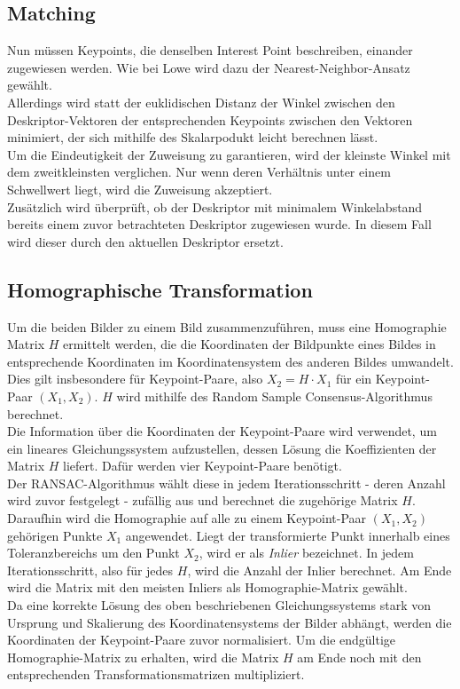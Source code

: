 \documentclass[deutsch]{scrartcl}
\begin{document}
\subsection{Matching} 
Nun müssen Keypoints, die denselben Interest Point beschreiben, einander zugewiesen werden. Wie bei Lowe\cite{lowe04} wird dazu der Nearest-Neighbor-Ansatz gewählt.\\
Allerdings wird statt der euklidischen Distanz der Winkel zwischen den Deskriptor-Vektoren der entsprechenden Keypoints zwischen den Vektoren minimiert, der sich mithilfe des Skalarpodukt leicht berechnen lässt. \\
Um die Eindeutigkeit der Zuweisung zu garantieren, wird der kleinste Winkel mit dem zweitkleinsten verglichen\cite{lowe04}. Nur wenn deren Verhältnis unter einem Schwellwert liegt, wird die Zuweisung akzeptiert.\\
Zusätzlich wird überprüft, ob der Deskriptor mit minimalem Winkelabstand bereits einem zuvor betrachteten Deskriptor zugewiesen wurde. In diesem Fall wird dieser durch den aktuellen Deskriptor ersetzt.\\

\subsection{Homographische Transformation}
Um die beiden Bilder zu einem Bild zusammenzuführen, muss eine Homographie Matrix $H$ ermittelt werden, die die Koordinaten der Bildpunkte eines Bildes in entsprechende Koordinaten im Koordinatensystem des anderen Bildes umwandelt. Dies gilt insbesondere für Keypoint-Paare, also $X_2=H\cdot X_1$ für ein Keypoint-Paar $(X_1,X_2)$. $H$ wird mithilfe des Random Sample Consensus-Algorithmus\cite{dubrovsky09} berechnet.\\
Die Information über die Koordinaten der Keypoint-Paare wird verwendet, um ein lineares Gleichungssystem aufzustellen, dessen Lösung die Koeffizienten der Matrix $H$ liefert. Dafür werden vier Keypoint-Paare benötigt.\cite{kriegman07}\\
Der RANSAC-Algorithmus wählt diese in jedem Iterationsschritt - deren Anzahl wird zuvor festgelegt - zufällig aus und berechnet die zugehörige Matrix $H$. Daraufhin wird die Homographie auf alle zu einem Keypoint-Paar $(X_1,X_2)$ gehörigen Punkte $X_1$ angewendet. Liegt der transformierte Punkt innerhalb eines Toleranzbereichs um den Punkt $X_2$, wird er als \textit{Inlier} bezeichnet. In jedem Iterationsschritt, also für jedes $H$, wird die Anzahl der Inlier berechnet. Am Ende wird die Matrix mit den meisten Inliers als Homographie-Matrix gewählt.\\
Da eine korrekte Lösung des oben beschriebenen Gleichungssystems stark von Ursprung und Skalierung des Koordinatensystems der Bilder abhängt, werden die Koordinaten der Keypoint-Paare zuvor normalisiert. Um die endgültige Homographie-Matrix zu erhalten, wird die Matrix $H$ am Ende noch mit den entsprechenden Transformationsmatrizen multipliziert.\cite{dubrovsky09}
\end{document}
